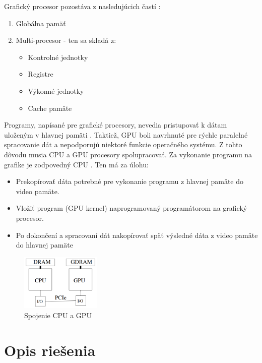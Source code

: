 \documentclass[conference]{IEEEtran}
\begin{document}
Grafický procesor pozostáva z nasledujúcich častí \cite{tatourian}:

\begin{enumerate}
	\item{Globálna pamäť}
	\item{Multi-procesor - ten sa skladá z:}
	\begin{itemize}
		\item{Kontrolné jednotky}
		\item{Registre}
		\item{Výkonné jednotky}
		\item{Cache pamäte}
	\end{itemize}
\end{enumerate}

Programy, napísané pre grafické procesory, nevedia pristupovať k dátam uloženým v hlavnej pamäti \cite{gpuRowe}. Taktiež, GPU boli navrhnuté pre rýchle paralelné spracovanie dát a nepodporujú niektoré funkcie operačného systému. Z tohto dôvodu musia CPU a GPU procesory spolupracovať. Za vykonanie programu na grafike je zodpovedný CPU \cite{tatourian}. Ten má za úlohu:

\begin{itemize}
	\item{Prekopírovať dáta potrebné pre vykonanie programu z hlavnej pamäte do video pamäte.}
	\item{Vložiť program (GPU kernel) naprogramovaný programátorom na grafický procesor.}
	\item{Po dokončení a spracovaní dát nakopírovať späť výsledné dáta z video pamäte do hlavnej pamäte}
\end{itemize}

\begin{figure}[!h]
\centering
\includegraphics[width=1.5in]{img/CPU+GPU}
\caption{Spojenie CPU a GPU}
\end{figure}

\section{Opis riešenia}
\end{document}
